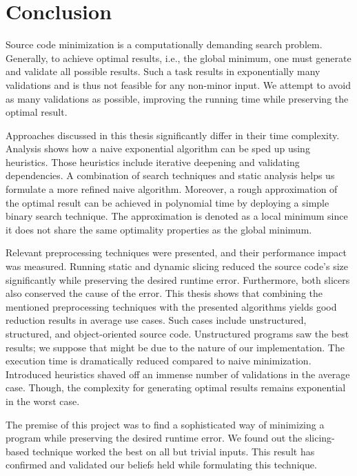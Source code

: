 \chapter{Conclusion}


Source code minimization is a computationally demanding search problem. 
Generally, to achieve optimal results, i.e., the global minimum, one must 
generate and validate all possible results. 
Such a task results in exponentially many validations and is thus not feasible 
for any non-minor input. 
We attempt to avoid as many validations as possible, improving the running 
time while preserving the optimal result.

Approaches discussed in this thesis significantly differ in their time complexity. 
Analysis shows how a naive exponential algorithm can be sped up using 
heuristics. Those heuristics include iterative deepening and validating 
dependencies. 
A combination of search techniques and static analysis helps us formulate 
a more refined naive algorithm. 
Moreover, a rough approximation of the optimal result can be achieved 
in polynomial time by deploying a simple binary search technique. 
The approximation is denoted as a local minimum since it does not share 
the same optimality properties as the global minimum.

Relevant preprocessing techniques were presented, and their performance impact 
was measured. 
Running static and dynamic slicing reduced the source code's size 
significantly while preserving the desired runtime error. 
Furthermore, both slicers also conserved the cause of the error.
This thesis shows that combining the mentioned preprocessing techniques with 
the presented algorithms yields good reduction results in average use cases. 
Such cases include unstructured, structured, and object-oriented source code. 
Unstructured programs saw the best results; we suppose that might be due to 
the nature of our implementation. 
The execution time is dramatically reduced compared to naive minimization. 
Introduced heuristics shaved off an immense number of validations in 
the average case. 
Though, the complexity for generating optimal results remains exponential in 
the worst case.

The premise of this project was to find a sophisticated way of minimizing 
a program while preserving the desired runtime error. 
We found out the slicing-based technique worked the best on all but trivial 
inputs. 
This result has confirmed and validated our beliefs held while formulating 
this technique.

